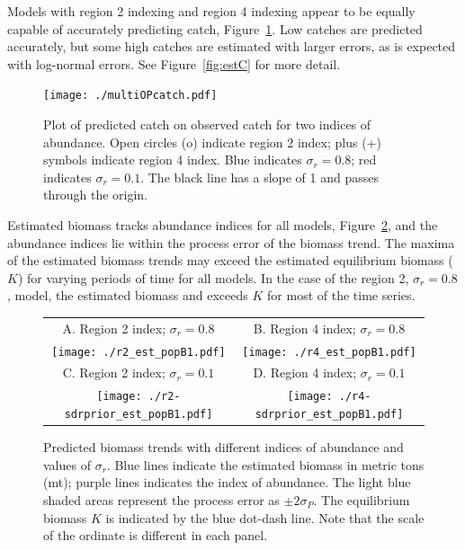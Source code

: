 \documentclass[12pt,letterpaper]{article}
\begin{document}
\pagebreak[4]
Models with region 2 indexing and region 4 indexing appear to be
equally capable of accurately predicting catch,
Figure~\ref{fig:mopcatch}. Low catches are predicted
accurately, but some high catches are estimated with larger errors, as is
expected with log-normal errors. 
See Figure~\ref{fig:estC} for more detail.

\begin{figure}
\begin{center}
\texttt{[image: ./multiOPcatch.pdf]}
\caption{Plot of predicted catch on observed catch for two indices of
abundance.
Open circles (o) indicate region 2 index; plus (+) symbols indicate
region 4 index.
Blue indicates $\sigma_r=0.8$; red indicates $\sigma_r=0.1$.
The black line has a slope of 1 and passes through the origin.
\label{fig:mopcatch}
}
\end{center}
\end{figure}

Estimated biomass tracks abundance indices for all models,
Figure~\ref{fig:estbiomass}, and the abundance indices lie within the
process error of the biomass trend.
The maxima of the estimated biomass trends may exceed the
estimated equilibrium biomass ($K$) for varying periods of time for
all models.
In the case of the region 2, $\sigma_r=0.8$, model,
the estimated biomass and exceeds $K$
for most of the time series.


\begin{figure}
\begin{center}
{\scriptsize \sffamily
\begin{tabular}{cc}
A. Region 2 index; $\sigma_r=0.8$ &
B. Region 4 index; $\sigma_r=0.8$ \\
\texttt{[image: ./r2\_est\_popB1.pdf]} &
\texttt{[image: ./r4\_est\_popB1.pdf]} \\
C. Region 2 index; $\sigma_r=0.1$ &
D. Region 4 index; $\sigma_r=0.1$ \\
\texttt{[image: ./r2-sdrprior\_est\_popB1.pdf]} &
\texttt{[image: ./r4-sdrprior\_est\_popB1.pdf]} \\
\end{tabular}
}
\caption{Predicted biomass trends with different indices of abundance
and values of $\sigma_r$.
Blue lines indicate the estimated biomass in metric tons (mt);
purple lines indicates the index of abundance.
The light blue shaded areas represent the process error as 
$\pm 2\sigma_P$.
The equilibrium biomass $K$ is indicated by the blue dot-dash line.
Note that the scale of the ordinate is different in each panel.
\label{fig:estbiomass}}
\end{center}
\end{figure}
\end{document}
